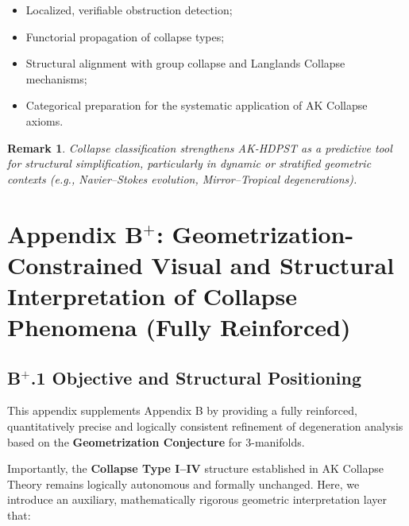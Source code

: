 \documentclass[11pt]{article}
\newtheorem{remark}[theorem]{Remark}
\begin{document}
\begin{itemize}
    \item Localized, verifiable obstruction detection;
    \item Functorial propagation of collapse types;
    \item Structural alignment with group collapse and Langlands Collapse mechanisms;
    \item Categorical preparation for the systematic application of AK Collapse axioms.
\end{itemize}

\begin{remark}
Collapse classification strengthens AK-HDPST as a predictive tool for structural simplification, particularly in dynamic or stratified geometric contexts (e.g., Navier–Stokes evolution, Mirror–Tropical degenerations).
\end{remark}




\section*{Appendix B$^{+}$: Geometrization-Constrained Visual and Structural Interpretation of Collapse Phenomena (Fully Reinforced)}

\subsection*{B$^{+}$.1 Objective and Structural Positioning}

This appendix supplements Appendix B by providing a fully reinforced, quantitatively precise and logically consistent refinement of degeneration analysis based on the \textbf{Geometrization Conjecture} for $3$-manifolds.

Importantly, the \textbf{Collapse Type I–IV} structure established in AK Collapse Theory remains logically autonomous and formally unchanged. Here, we introduce an auxiliary, mathematically rigorous geometric interpretation layer that:
\end{document}
